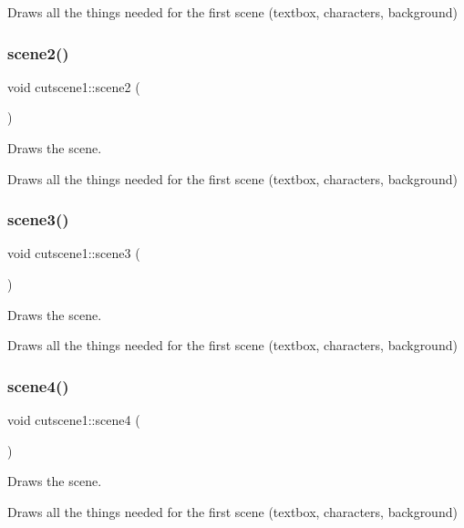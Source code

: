 Draws all the things needed for the first scene (textbox, characters, background) \mbox{\label{classcutscene1_a8ccf64a236d3ddc02d9fe3c1c612495e}} 
\subsubsection{\texorpdfstring{scene2()}{scene2()}}
{\footnotesize\ttfamily void cutscene1\+::scene2 (\begin{DoxyParamCaption}{ }\end{DoxyParamCaption})}



Draws the scene. 

Draws all the things needed for the first scene (textbox, characters, background) \mbox{\label{classcutscene1_a1d3f3933b12bc06b7384bb0f81b00bc0}} 
\subsubsection{\texorpdfstring{scene3()}{scene3()}}
{\footnotesize\ttfamily void cutscene1\+::scene3 (\begin{DoxyParamCaption}{ }\end{DoxyParamCaption})}



Draws the scene. 

Draws all the things needed for the first scene (textbox, characters, background) \mbox{\label{classcutscene1_abbb516e182b20fe773d09419349ecbfe}} 
\subsubsection{\texorpdfstring{scene4()}{scene4()}}
{\footnotesize\ttfamily void cutscene1\+::scene4 (\begin{DoxyParamCaption}{ }\end{DoxyParamCaption})}



Draws the scene. 

Draws all the things needed for the first scene (textbox, characters, background) \mbox{\label{classcutscene1_ace82590104cccbecfd5ec0b4bacaca91}} 
